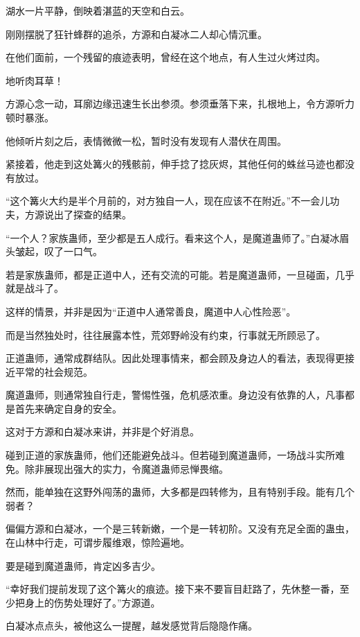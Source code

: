
\begin{this_body}

湖水一片平静，倒映着湛蓝的天空和白云。

刚刚摆脱了狂针蜂群的追杀，方源和白凝冰二人却心情沉重。

在他们面前，一个残留的痕迹表明，曾经在这个地点，有人生过火烤过肉。

地听肉耳草！

方源心念一动，耳廓边缘迅速生长出参须。参须垂落下来，扎根地上，令方源听力顿时暴涨。

他倾听片刻之后，表情微微一松，暂时没有发现有人潜伏在周围。

紧接着，他走到这处篝火的残骸前，伸手捻了捻灰烬，其他任何的蛛丝马迹也都没有放过。

“这个篝火大约是半个月前的，对方独自一人，现在应该不在附近。”不一会儿功夫，方源说出了探查的结果。

“一个人？家族蛊师，至少都是五人成行。看来这个人，是魔道蛊师了。”白凝冰眉头皱起，叹了一口气。

若是家族蛊师，都是正道中人，还有交流的可能。若是魔道蛊师，一旦碰面，几乎就是战斗了。

这样的情景，并非是因为“正道中人通常善良，魔道中人心性险恶”。

而是当然独处时，往往展露本性，荒郊野岭没有约束，行事就无所顾忌了。

正道蛊师，通常成群结队。因此处理事情来，都会顾及身边人的看法，表现得更接近平常的社会规范。

魔道蛊师，则通常独自行走，警惕性强，危机感浓重。身边没有依靠的人，凡事都是首先来确定自身的安全。

这对于方源和白凝冰来讲，并非是个好消息。

碰到正道的家族蛊师，他们还能避免战斗。但若碰到魔道蛊师，一场战斗实所难免。除非展现出强大的实力，令魔道蛊师忌惮畏缩。

然而，能单独在这野外闯荡的蛊师，大多都是四转修为，且有特别手段。能有几个弱者？

偏偏方源和白凝冰，一个是三转新嫩，一个是一转初阶。又没有充足全面的蛊虫，在山林中行走，可谓步履维艰，惊险遍地。

要是碰到魔道蛊师，肯定凶多吉少。

“幸好我们提前发现了这个篝火的痕迹。接下来不要盲目赶路了，先休整一番，至少把身上的伤势处理好了。”方源道。

白凝冰点点头，被他这么一提醒，越发感觉背后隐隐作痛。


\end{this_body}
